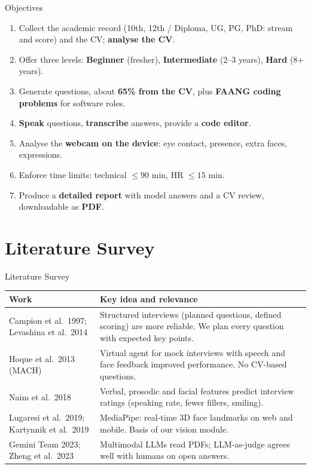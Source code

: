 \documentclass[aspectratio=169,11pt,xcolor=table]{beamer}
\begin{document}
\begin{frame}{Objectives}
  \begin{enumerate}
    \item Collect the academic record (10th, 12th / Diploma, UG, PG, PhD: stream and score) and the CV; \textbf{analyse the CV}.
    \item Offer three levels: \textbf{Beginner} (fresher), \textbf{Intermediate} (2--3 years), \textbf{Hard} (8+ years).
    \item Generate questions, about \textbf{65\% from the CV}, plus \textbf{FAANG coding problems} for software roles.
    \item \textbf{Speak} questions, \textbf{transcribe} answers, provide a \textbf{code editor}.
    \item Analyse the \textbf{webcam on the device}: eye contact, presence, extra faces, expressions.
    \item Enforce time limits: technical $\le 90$ min, HR $\le 15$ min.
    \item Produce a \textbf{detailed report} with model answers and a CV review, downloadable as \textbf{PDF}.
  \end{enumerate}
\end{frame}

\section{Literature Survey}
\begin{frame}{Literature Survey}
  \small
  \begin{tabularx}{\textwidth}{@{}p{3.6cm}Y@{}}
    \toprule
    \textbf{Work} & \textbf{Key idea and relevance} \\
    \midrule
    Campion et al.\ 1997; Levashina et al.\ 2014 & Structured interviews (planned questions, defined scoring) are more reliable. We plan every question with expected key points. \\
    Hoque et al.\ 2013 (MACH) & Virtual agent for mock interviews with speech and face feedback improved performance. No CV-based questions. \\
    Naim et al.\ 2018 & Verbal, prosodic and facial features predict interview ratings (speaking rate, fewer fillers, smiling). \\
    Lugaresi et al.\ 2019; Kartynnik et al.\ 2019 & MediaPipe: real-time 3D face landmarks on web and mobile. Basis of our vision module. \\
    Gemini Team 2023; Zheng et al.\ 2023 & Multimodal LLMs read PDFs; LLM-as-judge agrees well with humans on open answers. \\
    \bottomrule
  \end{tabularx}
\end{frame}
\end{document}
